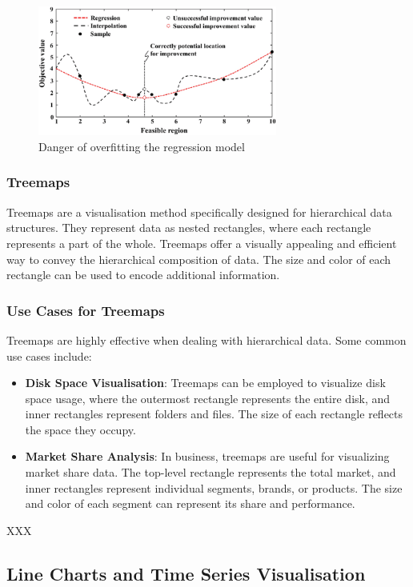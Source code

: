 \documentclass{article}\usepackage[]{graphicx}\usepackage[]{xcolor}
\begin{document}
\begin{figure}[h]
    \centering
    \includegraphics[width=0.7\textwidth]{overfitting.png}
    \caption{Danger of overfitting the regression model}
    \label{fig:noisy}
\end{figure}

\subsubsection{Treemaps}
Treemaps are a visualisation method specifically designed for hierarchical data structures. They represent data as nested rectangles, where each rectangle represents a part of the whole. Treemaps offer a visually appealing and efficient way to convey the hierarchical composition of data. The size and color of each rectangle can be used to encode additional information.

\subsubsection{Use Cases for Treemaps}
Treemaps are highly effective when dealing with hierarchical data. Some common use cases include:
\begin{itemize}
\item \textbf{Disk Space Visualisation}: Treemaps can be employed to visualize disk space usage, where the outermost rectangle represents the entire disk, and inner rectangles represent folders and files. The size of each rectangle reflects the space they occupy.
\item \textbf{Market Share Analysis}: In business, treemaps are useful for visualizing market share data. The top-level rectangle represents the total market, and inner rectangles represent individual segments, brands, or products. The size and color of each segment can represent its share and performance.
\end{itemize}

XXX %


\subsection{Line Charts and Time Series Visualisation}
\end{document}
